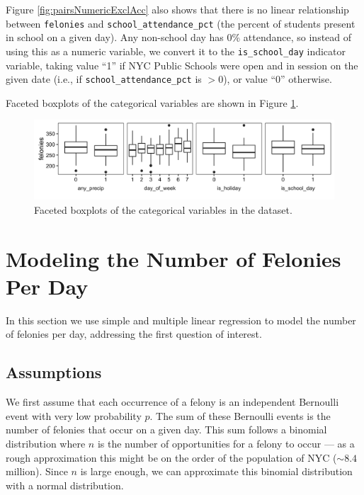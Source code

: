 \documentclass[11pt,notitlepage]{article}
\begin{document}
Figure \ref{fig:pairsNumericExclAcc} also shows that there is no linear relationship between \texttt{felonies} and \texttt{school_attendance_pct} (the percent of students present in school on a given day). Any non-school day has 0\% attendance, so instead of using this as a numeric variable, we convert it to the \texttt{is_school_day} indicator variable, taking value ``1'' if NYC Public Schools were open and in session on the given date (i.e., if \texttt{school_attendance_pct} is $>0$), or value ``0'' otherwise.

Faceted boxplots of the categorical variables are shown in Figure \ref{fig:facetCategorical}.

\begin{figure}[!h]
	\centering
	\captionsetup{width=0.9\textwidth}
	\includegraphics[width=6in]{figures/facetCategorical.png}
	\vspace*{-5mm}
	\caption{Faceted boxplots of the categorical variables in the dataset.}
	\label{fig:facetCategorical}
	\vspace*{-3mm}
\end{figure}

\section{Modeling the Number of Felonies Per Day}
\label{sec:modelingFelonies}

In this section we use simple and multiple linear regression to model the number of felonies per day, addressing the first question of interest.

\subsection{Assumptions}
\label{sec:feloniesAssumptions}

We first assume that each occurrence of a felony is an independent Bernoulli event with very low probability $p$. The sum of these Bernoulli events is the number of felonies that occur on a given day. This sum follows a binomial distribution where $n$ is the number of opportunities for a felony to occur --- as a rough approximation this might be on the order of the population of NYC ($\sim 8.4$ million). Since $n$ is large enough, we can approximate this binomial distribution with a normal distribution.
\end{document}
